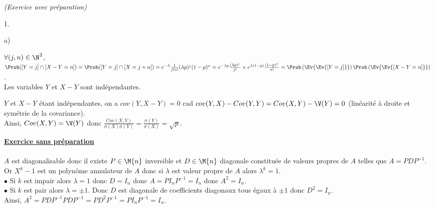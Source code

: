 \documentclass[11pt]{article}%
\begin{document}
\begin{exercice}{\it (Exercice avec préparation)}
\begin{noliste}{1.}
\item
  \begin{noliste}{a)}
 \setlength{\itemsep}{2mm}
 \item $\forall (j,n) \in \N^{2}$, $\Prob([Y = j ] \cap [X-Y = n]) =
\Prob([Y = j] \cap [X = j + n]) = e^{-\lambda} \frac{1}{j!n!} (\lambda
p)^{j}(1-p)^{n} = e^{-\lambda p} \frac{(\lambda p)^{j}}{j!} \times
e^{\lambda(1-p)} \frac{(1-p)^{n}}{n!} = \Prob\left(\Ev{\Ev{[Y =
j]}}\right)\Prob\left(\Ev{\Ev{[X-Y = n]}}\right)$.\\
 Les variables $Y$ et $X-Y$ sont indépendantes.
 \item $Y$ et $X-Y$ étant indépendantes, on a $cov(Y, X-Y) = 0$ cad
$cov(Y,X)- Cov(Y,Y) = Cov(X,Y)-\V(Y) = 0$ (linéarité à droite et
symétrie de la covariance). \\
 Ainsi, $Cov(X,Y) = \V(Y) $ donc $\frac{Cov(X,Y)}{\sigma(X) \sigma(Y)}
= \frac{ \sigma(Y)}{\sigma(X)} = \sqrt{p}$. 
 \end{noliste}
 \end{noliste}
 \textbf{\underline{Exercice sans préparation}} \\
\\
 $A$ est diagonalisable donc il existe $P \in \M{n}$ inversible et
$D\in \M{n} $ diagonale constituée de valeurs propres de $A$ telles que
$A = PDP^{-1}$. \\
 Or $X^{k}-1$ est un polynôme annulateur de $A$ donc si $\lambda$ est
valeur propre de $A$ alors $\lambda^{k} = 1$. \\
 $\bullet$ Si $k$ est impair alors $\lambda = 1$ donc $D = I_{n}$ donc
$A = PI_{n} P^{-1} = I_{n}$ donc $A^{2} = I_{n}$.\\
 $\bullet$ Si $k$ est pair alors $\lambda = \pm 1$. Donc $D$ est
diagonale de coefficients diagonaux tous égaux à $\pm 1$ donc $D^{2} =
I_{n}$.\\
 Ainsi, $A^{2} = PDP^{-1} PDP^{-1} = PD^{2} P^{-1} = PI_{n} P^{-1} =
I_{n}$. 
 \end{exercice}
\end{document}
